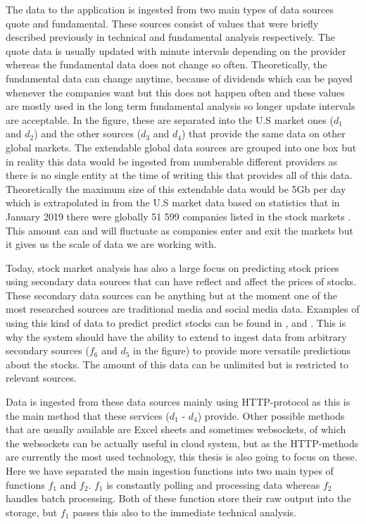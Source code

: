 The data to the application is ingested from two main types of data sources quote and fundamental.
These sources consist of values that were briefly described previously in technical and fundamental analysis respectively.
The quote data is usually updated with minute intervals depending on the provider whereas the fundamental data does not change so often.
Theoretically, the fundamental data can change anytime, because of dividends which can be payed whenever the companies want but this does not happen often and these values are mostly used in the long term fundamental analysis so longer update intervals are acceptable.
In the figure, these are separated into the U.S market ones ($d_1$ and $d_2$) and the other sources ($d_3$ and $d_4$) that provide the same data on other global markets.
The extendable global data sources are grouped into one box but in reality this data would be ingested from numberable different providers as there is no single entity at the time of writing this that provides all of this data.
Theoretically the maximum size of this extendable data would be 5Gb per day which is extrapolated in from the U.S market data based on statistics that in January 2019 there were globally 51 599 companies listed in the stock markets \cite{global}.
This amount can and will fluctuate as companies enter and exit the markets but it gives us the scale of data we are working with.

Today, stock market analysis has also a large focus on predicting stock prices using secondary data sources that can have reflect and affect the prices of stocks. 
These secondary data sources can be anything but at the moment one of the most researched sources are traditional media and social media data.
Examples of using this kind of data to predict predict stocks can be found in \cite{kao}, \cite{skuza} and \cite{wai}.
This is why the system should have the ability to extend to ingest data from arbitrary secondary sources ($f_6$ and $d_5$ in the figure) to provide more versatile predictions about the stocks.
The amount of this data can be unlimited but is restricted to relevant sources.

Data is ingested from these data sources mainly using HTTP-protocol as this is the main method that these services ($d_1$ - $d_4$) provide.
Other possible methods that are usually available are Excel sheets and sometimes websockets, of which the websockets can be actually useful in cloud system, but as the HTTP-methods are currently the most used technology, this thesis is also going to focus on these.
Here we have separated the main ingestion functions into two main types of functions $f_1$ and $f_2$. 
$f_1$ is constantly polling and processing data whereas $f_2$ handles batch processing.
Both of these function store their raw output into the storage, but $f_1$ passes this also to the immediate technical analysis.

